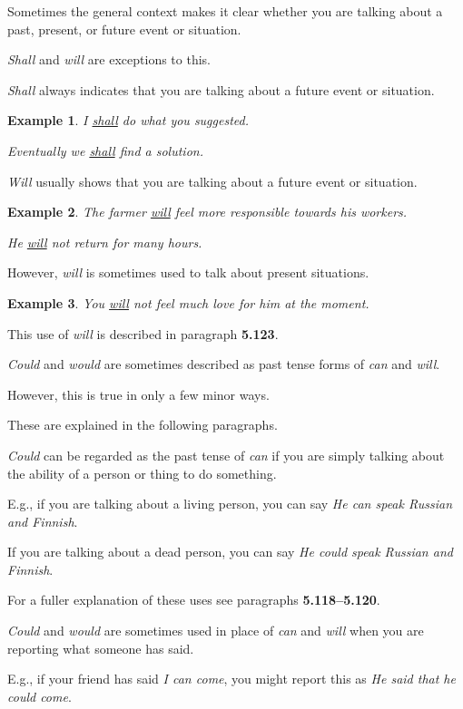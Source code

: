 \documentclass[oneside]{book}
\numberwithin{equation}{section}
\newtheorem{example}{Example}[section]
\begin{document}
Sometimes the general context makes it clear whether you are talking about a past, present, or future event or situation.

%
\noindent{} \textit{Shall} and \textit{will} are exceptions to this.

%
\textit{Shall} always indicates that you are talking about a future event or situation.
\begin{example}
    I \underline{shall} do what you suggested.
    
    Eventually we \underline{shall} find a solution.
\end{example}
\textit{Will} usually shows that you are talking about a future event or situation.
\begin{example}
    The farmer \underline{will} feel more responsible towards his workers.
    
    He \underline{will} not return for many hours.
\end{example}
However, \textit{will} is sometimes used to talk about present situations.
\begin{example}
    You \underline{will} not feel much love for him at the moment.
\end{example}
This use of \textit{will} is described in paragraph \textbf{5.123}.

%
\noindent{} \textit{Could} and \textit{would} are sometimes described as past tense forms of \textit{can} and \textit{will}.

However, this is true in only a few minor ways.

These are explained in the following paragraphs.

%
\noindent{} \textit{Could} can be regarded as the past tense of \textit{can} if you are simply talking about the ability of a person or thing to do something.

%
E.g., if you are talking about a living person, you can say \textit{He can speak Russian and Finnish}.

If you are talking about a dead person, you can say \textit{He could speak Russian and Finnish}.

%
For a fuller explanation of these uses see paragraphs \textbf{5.118--5.120}.

%
\noindent{} \textit{Could} and \textit{would} are sometimes used in place of \textit{can} and \textit{will} when you are reporting what someone has said.

%
E.g., if your friend has said \textit{I can come}, you might report this as \textit{He said that he could come}.
\end{document}

